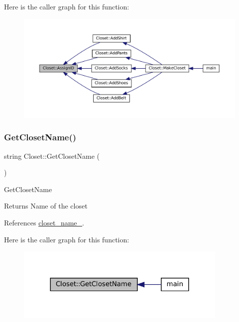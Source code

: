 Here is the caller graph for this function\+:
\nopagebreak
\begin{figure}[H]
\begin{center}
\leavevmode
\includegraphics[width=350pt]{classCloset_afabc27d621abdf0089a6b3027ea8f470_icgraph}
\end{center}
\end{figure}
\mbox{\label{classCloset_a108ab29dacfccd5d1c958d5ec88ad64f}} 
\subsubsection{\texorpdfstring{Get\+Closet\+Name()}{GetClosetName()}}
{\footnotesize\ttfamily string Closet\+::\+Get\+Closet\+Name (\begin{DoxyParamCaption}{ }\end{DoxyParamCaption})}

Get\+Closet\+Name

\begin{DoxyReturn}{Returns}
Name of the closet 
\end{DoxyReturn}


References \mbox{\hyperlink{classCloset_a3c06676b90e6ebe31d6dd276f2f0bcef}{closet\+\_\+name\+\_\+}}.

Here is the caller graph for this function\+:
\nopagebreak
\begin{figure}[H]
\begin{center}
\leavevmode
\includegraphics[width=288pt]{classCloset_a108ab29dacfccd5d1c958d5ec88ad64f_icgraph}
\end{center}
\end{figure}
\mbox{\label{classCloset_ac1057604430a855ca081cbfe16af10a5}} 
